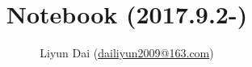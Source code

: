 \documentclass[10pt]{article}
\title{\vspace{-4ex}\Large{ Notebook (2017.9.2-)}}
\author{Liyun Dai (\url{dailiyun2009@163.com})}
\date{}
\begin{document}
\begin{landscape}
\begin{multicols}{2}

\maketitle
\vspace{-13ex}
\tableofcontents
\pagestyle{fancy}



\end{multicols}
\end{landscape}
\end{document}
